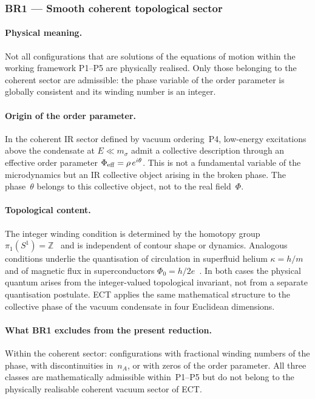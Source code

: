 \documentclass[11pt,a4paper]{article}
\numberwithin{equation}{section}
\begin{document}
\subsubsection*{BR1 --- Smooth coherent topological sector}

\paragraph{Physical meaning.}
Not all configurations that are solutions of the equations of motion
within the working framework P1--P5 are physically realised. Only those belonging to the
coherent sector are admissible: the phase variable of the order
parameter is globally consistent and its winding number is an integer.

\paragraph{Origin of the order parameter.}
In the coherent IR sector defined by vacuum ordering~P4,
low-energy excitations above the condensate at $E\ll m_\sigma$
admit a collective description through an effective order parameter
$\Phi_{\rm eff}=\rho\,e^{i\theta}$.
This is not a fundamental variable of the microdynamics but an
IR collective object arising in the broken phase.
The phase~$\theta$ belongs to this collective object, not to the
real field~$\Phi$.

\paragraph{Topological content.}
The integer winding condition is determined by the homotopy group
$\pi_1(S^1)=\mathbb{Z}$~\cite{Nakahara2003} and is independent of
contour shape or dynamics.
Analogous conditions underlie the quantisation of circulation in
superfluid helium $\kappa=h/m$~\cite{Donnelly1991} and of magnetic
flux in superconductors $\Phi_0=h/2e$~\cite{Abrikosov1957}.
In both cases the physical quantum arises from the integer-valued
topological invariant, not from a separate quantisation postulate.
ECT applies the same mathematical structure to the collective phase
of the vacuum condensate in four Euclidean dimensions.

\paragraph{What BR1 excludes from the present reduction.}
Within the coherent sector: configurations with fractional winding
numbers of the phase, with discontinuities in~$n_A$, or with zeros
of the order parameter. All three classes are mathematically
admissible within~P1--P5 but do not belong to the physically realisable
coherent vacuum sector of ECT.
\end{document}
